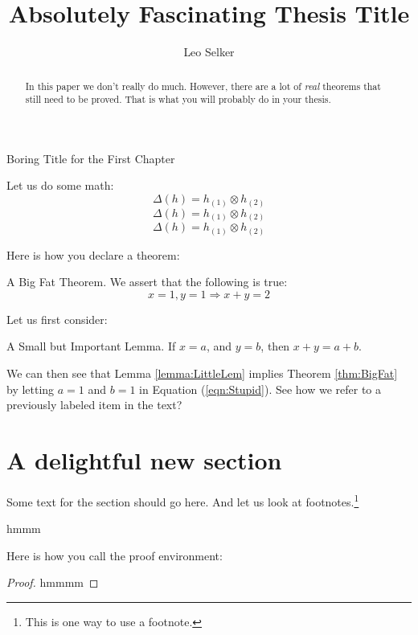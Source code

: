 \documentclass[12pt]{pom_thesis}
\author{Leo Selker}
\title{Absolutely Fascinating Thesis Title}
\theoremstyle{plain}{
\newtheorem{thm}{Theorem}[chapter]
\newtheorem{lemma}[thm]{Lemma}
\newtheorem{prop}[thm]{Proposition}
\newtheorem{cor}[thm]{Corollary}
\newtheorem{conj}[thm]{Conjecture}
}
\theoremstyle{definition}{
\newtheorem{defn}[thm]{Definition}
\newtheorem{examp}[thm]{Example}
\newtheorem{rmk}[thm]{Remark}
}\fi
\begin{document}
\maketitle

\begin{abstract}In this paper we don't really do much.  However, there are a lot of {\it real} theorems that still need to be proved. That is what you will probably do in your thesis.
\end{abstract}

\tableofcontents

\newpage
{}

\begin{chapter}{Boring Title for the First Chapter}
\label{Intro}

Let us do some math:
$$ \Delta(h) = h_{(1)} \otimes h_{(2)} $$
\[ \Delta(h) = h_{(1)} \otimes h_{(2)} \]
\begin{equation*}
\Delta(h) = h_{(1)} \otimes h_{(2)}
\end{equation*}

Here is how you declare a theorem:

\begin{thm}{A Big Fat Theorem.} \label{thm:BigFat}
We assert that the following is true:
\begin{equation} \label{eqn:Stupid}
x = 1, y = 1 \Rightarrow x + y = 2
\end{equation}
\end{thm}

Let us first consider:
\begin{lemma}{A Small but Important Lemma.} \label{lemma:LittleLem}
If $x = a$, and $y = b$, then $x + y = a + b$.
\end{lemma}

We can then see that Lemma \ref{lemma:LittleLem} implies Theorem \ref{thm:BigFat} by letting $a = 1$ and $b = 1$ in Equation (\ref{eqn:Stupid}). See how we refer to a previously labeled item in the text?

\section{A delightful new section}

Some text for the section should go here. And let us look at footnotes.\footnote{This is one way to use a footnote.} \footnotemark



\begin{thm}
hmmm
\end{thm}

Here is how you call the proof environment:

\begin{proof}
hmmmm
\end{proof}

\end{chapter}
\end{document}

